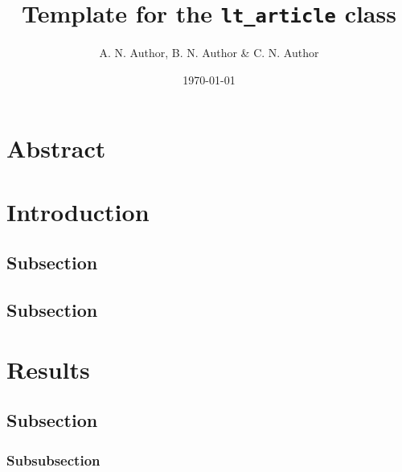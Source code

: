 \documentclass[a4paper, 11pt]{lt_article}
\title{Template for the \texttt{lt\_article} class}
\author{A. N. Author, B. N. Author \& C. N. Author}
\date{\today}
\begin{document}
\maketitle

\section*{Abstract} %

\blindtext

\section{Introduction} %

\Blindtext[1]

\subsection{Subsection} %

\Blindtext[3]

\subsection{Subsection} %

\Blindtext[2]


\section{Results} %

\subsection{Subsection} %

\Blindtext[1]

\subsubsection{Subsubsection}
\Blindtext[2]
\end{document}
